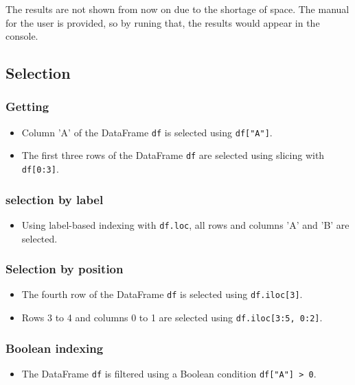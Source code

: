 	The results are not shown from now on due to the shortage of space. The manual for the user is provided, so by runing that, the results would appear in the console.
	
	\subsection{Selection}

		\subsubsection{Getting}
		
		\begin{itemize}
			
			\item Column 'A' of the DataFrame \texttt{df} is selected using \texttt{df["A"]}.
			
			\item The first three rows of the DataFrame \texttt{df} are selected using slicing with \texttt{df[0:3]}.
			
		\end{itemize}
	
		\subsubsection{selection by label}
		\begin{itemize}
			
			\item Using label-based indexing with \texttt{df.loc}, all rows and columns 'A' and 'B' are selected.
			
		\end{itemize}

		\subsubsection{Selection by position}
		\begin{itemize}
			\item The fourth row of the DataFrame \texttt{df} is selected using \texttt{df.iloc[3]}.
			\item Rows 3 to 4 and columns 0 to 1 are selected using \texttt{df.iloc[3:5, 0:2]}.
		\end{itemize}
		
		\subsubsection{Boolean indexing}
		\begin{itemize}
			\item The DataFrame \texttt{df} is filtered using a Boolean condition \texttt{df["A"] > 0}.
		\end{itemize}
		
